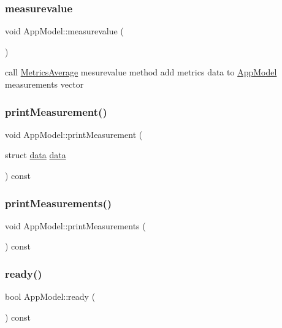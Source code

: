 \subsubsection{\texorpdfstring{measurevalue}{measurevalue}}
{\footnotesize\ttfamily void App\+Model\+::measurevalue (\begin{DoxyParamCaption}{ }\end{DoxyParamCaption})\hspace{0.3cm}{\ttfamily [slot]}}

call \hyperlink{class_metrics_average}{Metrics\+Average} mesurevalue method add metrics data to \hyperlink{class_app_model}{App\+Model} measurements vector \mbox{\label{class_app_model_a2bb0474a4f5f73ca23f9f72c97912192}} 
\subsubsection{\texorpdfstring{print\+Measurement()}{printMeasurement()}}
{\footnotesize\ttfamily void App\+Model\+::print\+Measurement (\begin{DoxyParamCaption}\item[{struct \hyperlink{structdata}{data} \hyperlink{structdata}{data}}]{ }\end{DoxyParamCaption}) const}

\mbox{\label{class_app_model_ac60073d6c96f7471f7227be130033399}} 
\subsubsection{\texorpdfstring{print\+Measurements()}{printMeasurements()}}
{\footnotesize\ttfamily void App\+Model\+::print\+Measurements (\begin{DoxyParamCaption}{ }\end{DoxyParamCaption}) const}

\mbox{\label{class_app_model_a3917fdc3dd8c97715991d9fd1a23abcc}} 
\subsubsection{\texorpdfstring{ready()}{ready()}}
{\footnotesize\ttfamily bool App\+Model\+::ready (\begin{DoxyParamCaption}{ }\end{DoxyParamCaption}) const}

